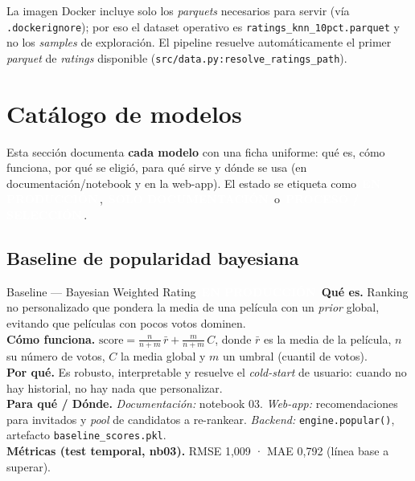 \documentclass[11pt,a4paper]{article}
\newcommand{\code}[1]{\textcolor{omnidark}{\texttt{#1}}}
\newcommand{\enprod}{\textcolor{white}{\colorbox{omniaccent}{\scriptsize\bfseries\,EN PRODUCCIÓN\,}}}
\newcommand{\noserv}{\textcolor{white}{\colorbox{omnigray}{\scriptsize\bfseries\,SOLO DOCUMENTACIÓN\,}}}
\newcommand{\proceso}{\textcolor{white}{\colorbox{omnigold}{\scriptsize\bfseries\,PROCESO / SELECCIÓN\,}}}
\begin{document}
\begin{infobox}
La imagen Docker incluye solo los \textit{parquets} necesarios para servir (vía \code{.dockerignore}); por eso el dataset operativo es \code{ratings\_knn\_10pct.parquet} y no los \textit{samples} de exploración. El pipeline resuelve automáticamente el primer \textit{parquet} de \textit{ratings} disponible (\code{src/data.py:resolve\_ratings\_path}).
\end{infobox}

\section{Catálogo de modelos}
\label{sec:modelos}
Esta sección documenta \textbf{cada modelo} con una ficha uniforme: qué es, cómo funciona, por qué se eligió, para qué sirve y dónde se usa (en documentación/notebook y en la web-app). El estado se etiqueta como \enprod{}, \noserv{} o \proceso{}.

\subsection{Baseline de popularidad bayesiana}
\begin{modelcard}{Baseline — Bayesian Weighted Rating \hfill \enprod}
\textbf{Qué es.} Ranking no personalizado que pondera la media de una película con un \textit{prior} global, evitando que películas con pocos votos dominen.\\[3pt]
\textbf{Cómo funciona.} $\text{score} = \frac{n}{n+m}\,\bar{r} + \frac{m}{n+m}\,C$, donde $\bar{r}$ es la media de la película, $n$ su número de votos, $C$ la media global y $m$ un umbral (cuantil de votos).\\[3pt]
\textbf{Por qué.} Es robusto, interpretable y resuelve el \textit{cold-start} de usuario: cuando no hay historial, no hay nada que personalizar.\\[3pt]
\textbf{Para qué / Dónde.} \emph{Documentación:} notebook 03. \emph{Web-app:} recomendaciones para invitados y \textit{pool} de candidatos a re-rankear. \emph{Backend:} \code{engine.popular()}, artefacto \code{baseline\_scores.pkl}.\\[3pt]
\textbf{Métricas (test temporal, nb03).} RMSE 1,009 · MAE 0,792 (línea base a superar).
\end{modelcard}
\end{document}
